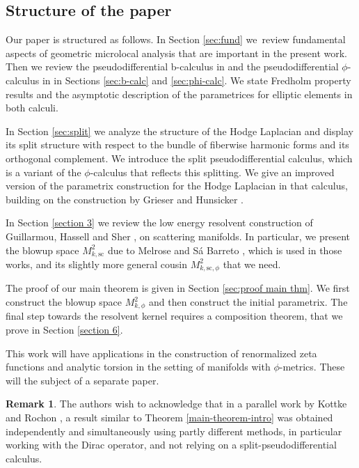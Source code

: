 \documentclass[JEP,XML,SOM,Unicode,NoFloatCountersInSection,published]{cedram}
\theoremstyle{plain}
\theoremstyle{definition}
\newtheorem{Rem}[Th]{Remark}
\newcommand{\ssc}{{\mathrm{sc}}}
\begin{document}
\subsection{Structure of the paper}
Our paper is structured as follows. In Section \ref{sec:fund} we~review fundamental
aspects of geometric microlocal analysis that are important in the
present work. Then we review the pseudodifferential b-calculus in \cite{melrose1993atiyah}
and the pseudodifferential $\phi$-calculus in \cite{mazzeo1998pseudodifferential} in Sections \ref{sec:b-calc} and \ref{sec:phi-calc}.
We state Fredholm property results and the asymptotic description of the parametrices
for elliptic elements in both calculi.

In Section \ref{sec:split} we analyze the structure of the Hodge Laplacian and display its split structure with respect to the bundle of fiberwise harmonic forms and its orthogonal complement. We introduce the split pseudodifferential calculus, which is a variant of the $\phi$-calculus that reflects this splitting. We give an improved version of the parametrix construction for the Hodge Laplacian in that calculus, building on the construction by
Grieser and Hunsicker \cite{grieser-para}.

In Section \ref{section 3} we review the low energy resolvent construction of Guillarmou, Hassell and Sher \cite{guillarmou2008resolvent}, \cite{guillarmou2014low} on scattering manifolds. In particular, we present the blowup space $M^2_{k,\ssc}$
due to Melrose and S{\'a} Barreto \cite{melrosesabarreto}, which is used in those works, and its slightly more general cousin $M^2_{k,\ssc,\phi}$ that we need.

The proof of our main theorem is given in Section \ref{sec:proof main thm}.
We first construct the blowup space $M^2_{k,\phi}$ and then construct the initial parametrix. The final step towards the resolvent kernel requires a composition theorem, that we prove in Section \ref{section 6}.

This work will have applications in the construction of renormalized zeta functions
and analytic torsion
in the setting of manifolds with $\phi$-metrics. These will the subject of a separate paper.

\begin{Rem}
The authors wish to acknowledge that in a parallel work by Kottke and Rochon \cite{kottke-rochon},
a result similar to Theorem \ref{main-theorem-intro} was obtained independently and simultaneously
using partly different methods, in particular working with the Dirac operator, and not
relying on a split-pseudodifferential calculus. \end{Rem}
\end{document}
